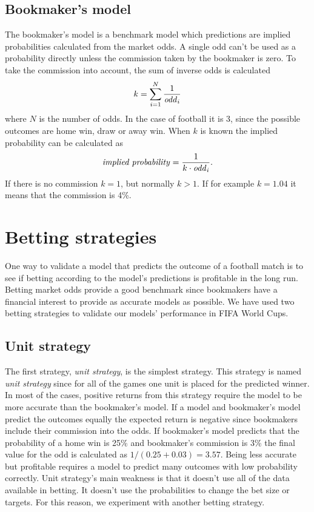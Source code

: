 \subsection{Bookmaker's model}
The bookmaker's model is a benchmark model which predictions are implied probabilities calculated from the market odds. A single odd can't be used as a probability directly unless the commission taken by the bookmaker is zero. To take the commission into account, the sum of inverse odds is calculated
\begin{equation}
    k = \sum_{i=1}^{N}\frac{1}{\text{\textit{odd}}_i}
\end{equation}
where $N$ is the number of odds. In the case of football it is 3, since the possible outcomes are home win, draw or away win.
When $k$ is known the implied probability can be calculated as
\begin{equation}
    \text{\textit{implied probability}} = \frac{1}{k \cdot \text{\textit{odd}}_i}\text{.}
\end{equation}
If there is no commission $k=1$, but normally $k>1$. If for example $k=1.04$ it means that the commission is 4\%.

\section{Betting strategies}
One way to validate a model that predicts the outcome of a football match is to see if betting according to the model's predictions is profitable in the long run. Betting market odds provide a good benchmark since bookmakers have a financial interest to provide as accurate models as possible. We have used two betting strategies to validate our models' performance in FIFA World Cups.

\subsection{Unit strategy}
The first strategy, \textit{unit strategy}, is the simplest strategy. This strategy is named \textit{unit strategy} since for all of the games one unit is placed for the predicted winner. In most of the cases, positive returns from this strategy require the model to be more accurate than the bookmaker's model. If a model and bookmaker's model predict the outcomes equally the expected return is negative since bookmakers include their commission into the odds. If bookmaker's model predicts that the probability of a home win is 25\% and bookmaker's commission is 3\% the final value for the odd is calculated as $1/(0.25+0.03) = 3.57$. Being less accurate but profitable requires a model to predict many outcomes with low probability correctly. Unit strategy's main weakness is that it doesn't use all of the data available in betting. It doesn't use the probabilities to change the bet size or targets. For this reason, we experiment with another betting strategy.


